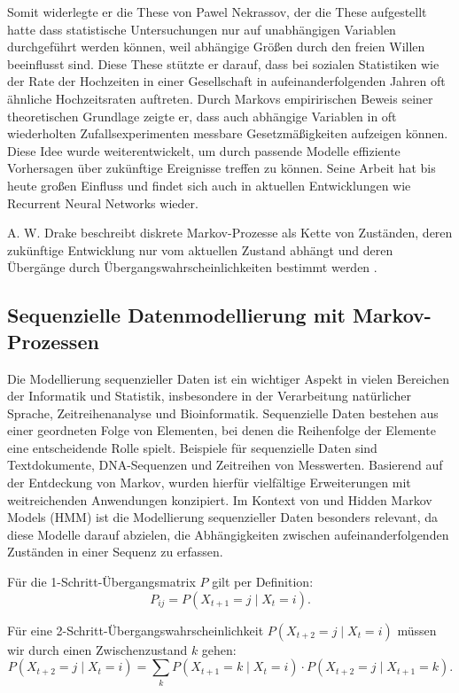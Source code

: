 Somit widerlegte er die These von Pawel Nekrassov, der die These aufgestellt hatte dass statistische Untersuchungen nur auf unabhängigen Variablen durchgeführt werden können, weil abhängige Größen durch den freien Willen beeinflusst sind. Diese These stützte er darauf, dass bei sozialen Statistiken wie der Rate der Hochzeiten in einer Gesellschaft in aufeinanderfolgenden Jahren oft ähnliche Hochzeitsraten auftreten. \citep{nekrasov-1912} Durch Markovs empiririschen Beweis seiner theoretischen Grundlage \citep{markov-1906} zeigte er, dass auch abhängige Variablen in oft wiederholten Zufallsexperimenten messbare Gesetzmäßigkeiten aufzeigen können.  Diese Idee wurde weiterentwickelt, um durch passende Modelle effiziente Vorhersagen über zukünftige Ereignisse treffen zu können.
Seine Arbeit hat bis heute großen Einfluss und findet sich auch in aktuellen Entwicklungen wie Recurrent Neural Networks wieder.

A. W. Drake beschreibt diskrete Markov-Prozesse als Kette von Zuständen, deren zukünftige Entwicklung nur vom aktuellen Zustand abhängt und deren Übergänge durch Übergangswahrscheinlichkeiten bestimmt werden \cite{drake88}.

\subsection{Sequenzielle Datenmodellierung mit Markov-Prozessen}

Die Modellierung sequenzieller Daten ist ein wichtiger Aspekt in vielen Bereichen der Informatik und Statistik, insbesondere in der Verarbeitung natürlicher Sprache, Zeitreihenanalyse und Bioinformatik. Sequenzielle Daten bestehen aus einer geordneten Folge von Elementen, bei denen die Reihenfolge der Elemente eine entscheidende Rolle spielt. Beispiele für sequenzielle Daten sind Textdokumente, DNA-Sequenzen und Zeitreihen von Messwerten.
Basierend auf der Entdeckung von Markov, wurden hierfür vielfältige Erweiterungen mit weitreichenden Anwendungen konzipiert.
Im Kontext von  und Hidden Markov Models (HMM) ist die Modellierung sequenzieller Daten besonders relevant, da diese Modelle darauf abzielen, die Abhängigkeiten zwischen aufeinanderfolgenden Zuständen in einer Sequenz zu erfassen.

Für die 1-Schritt-Übergangsmatrix $P$ gilt per Definition:
\begin{equation}
P_{ij} = P(X_{t+1} = j \mid X_t = i).
\end{equation}

Für eine 2-Schritt-Übergangswahrscheinlichkeit $P(X_{t+2} = j \mid X_t = i)$ müssen wir durch einen Zwischenzustand $k$ gehen:
\begin{equation}
P(X_{t+2} = j \mid X_t = i) = \sum_k P(X_{t+1} = k \mid X_t = i) \cdot P(X_{t+2} = j \mid X_{t+1} = k).
\end{equation}

